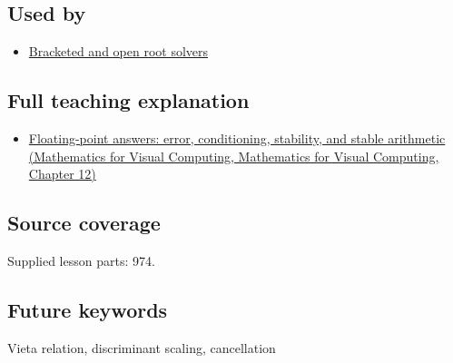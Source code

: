 \subsection{Used by}\label{appendix-b9afba7f63e5-used-by}

\begin{itemize}
\tightlist
\item
  \hyperref[appendix-f63eb850796d]{Bracketed and open root solvers}
\end{itemize}

\subsection{Full teaching explanation}\label{appendix-b9afba7f63e5-full-teaching-explanation}

\begin{itemize}
\tightlist
\item
  \href{../02-Mathematics-for-Visual-Computing/main.pdf\#nameddest=02-foundations-ii-ch028-floating-point-answers-error-conditioning-stability-and-stable-arithmetic}{Floating-point answers: error, conditioning, stability, and stable arithmetic (Mathematics for Visual Computing, Mathematics for Visual Computing, Chapter 12)}
\end{itemize}

\subsection{Source coverage}\label{appendix-b9afba7f63e5-source-coverage}

Supplied lesson parts: 974.

\subsection{Future keywords}\label{appendix-b9afba7f63e5-future-keywords}

Vieta relation, discriminant scaling, cancellation
